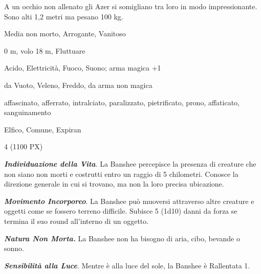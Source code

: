 \begin{multicols}{2}
{A un occhio non allenato gli Azer si somigliano tra loro in modo impressionante. Sono alti 1,2 metri ma pesano 100 kg.


\begin{description}[noitemsep, topsep=0pt, parsep=0pt, partopsep=0pt, itemsep=1pt, leftmargin=2.35cm,  labelwidth=2.2cm, itemindent=0cm, listparindent=0pt] %
\setlength{\baselineskip}{10pt}
\item[\textbf{Taglia/Tipo}] Media non morto, Arrogante, Vanitoso
\item[\textbf{Caratt.}] 
\item[\textbf{Punti Ferita}] 
\item[\textbf{Movimento}] 0 m, volo 18 m, Fluttuare
\item[\textbf{Tiri Salvez.}] 
\item[\textbf{Res. Danni}] Acido, Elettricità, Fuoco, Suono; arma magica +1
\item[\textbf{Imm. Danni}] da Vuoto, Veleno, Freddo, da arma non magica
\item[\textbf{Immunità}] affascinato, afferrato, intralciato, paralizzato, pietrificato, prono, affaticato, sanguinamento
\item[\textbf{Sensi}] 
\item[\textbf{Linguaggi}] Elfico, Comune, Expiran
\item[\textbf{Sfida}] 4 (1100 PX)
\end{description}
\smallskip

\emph{\textbf{Individuazione della Vita}}. La Banshee percepisce la presenza di creature che non siano non morti e costrutti entro un raggio di 5 chilometri. Conosce la direzione generale in cui si trovano, ma non la loro precisa ubicazione.

\emph{\textbf{Movimento Incorporeo}}. La Banshee può muoversi attraverso altre creature e oggetti come se fossero terreno difficile. Subisce 5 (1d10) danni da forza se termina il suo round all'interno di un oggetto.

\emph{\textbf{Natura Non Morta.}} La Banshee non ha bisogno di aria, cibo, bevande o sonno.

\emph{\textbf{Sensibilità alla Luce}}. Mentre è alla luce del sole, la Banshee è Rallentata 1.

}
\end{multicols}
